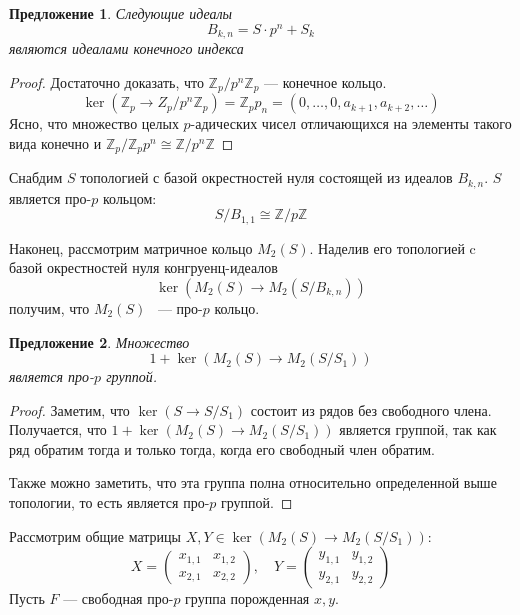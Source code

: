 \documentclass[12pt,a4paper]{article}
\newtheorem{proposition}{Предложение}[section]
\newcommand{\Z}{\ensuremath{\mathbb{Z}}}
\begin{document}
    \vskip 0.1in\noindent
    \begin{proposition}
        Следующие идеалы
        \[B_{k,n} = S \cdot p^n + S_k \]
        являются идеалами конечного индекса
    \end{proposition}
    \begin{proof}
        Достаточно доказать, что $\Z_p / p^n\Z_p$ --- конечное кольцо.
        \[
            \ker{(\Z_p \to Z_p / p^n\Z_p )} = \Z_p p_n = \left( 0,\ldots, 0, a_{k+1}, a_{k+2}, \ldots \right)
        \]
        Ясно, что множество целых $p$-адических чисел отличающихся на элементы такого вида конечно и
        $\Z_p / \Z_p p^n \cong \Z / p^n\Z$
    \end{proof}

    Снабдим $S$ топологией с базой окрестностей нуля состоящей из идеалов $B_{k,n}$.
    $S$ является про-$p$ кольцом:
    \[
        S / B_{1,1} \cong \Z/p\Z
    \]

    Наконец, рассмотрим матричное кольцо $M_2(S)$.
    Наделив его топологией c базой окрестностей нуля конгруенц-идеалов
    \[
        \ker{(M_2(S) \to M_2(S / B_{k,n}))}
    \]
    получим, что $M_2(S)$ ~--- про-$p$ кольцо.
    \vskip 0.1in\noindent
    \begin{proposition}
        Множество
        \[1 + \ker{(M_2(S) \to M_2(S / S_1))}\]
        является про-$p$ группой.
    \end{proposition}
    \begin{proof}
        Заметим, что $\ker{(S\to S/S_1)}$ состоит из рядов без свободного члена.
        Получается, что $1 + \ker{(M_2(S) \to M_2(S / S_1))}$ является группой, так как ряд обратим тогда и только тогда, когда его свободный член обратим.

        Также можно заметить, что эта группа полна относительно определенной выше топологии, то есть является про-$p$ группой.
    \end{proof}
    Рассмотрим общие матрицы $X, Y \in \ker{(M_2(S) \to M_2(S / S_1))}$:
    \[
        X=
        \begin{pmatrix}
            x_{1,1} & x_{1,2} \\
            x_{2,1} & x_{2,2}
        \end{pmatrix},
        \quad
        Y=
        \begin{pmatrix}
            y_{1,1} & y_{1,2} \\
            y_{2,1} & y_{2,2}
        \end{pmatrix}
    \]
    Пусть $F$ --- свободная про-$p$ группа порожденная $x, y$.
\end{document}
